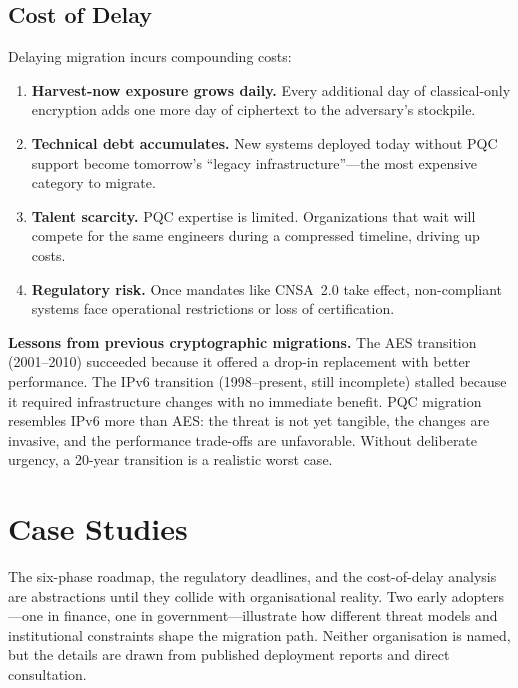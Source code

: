 \subsection{Cost of Delay}
\label{subsec:cost-delay}

Delaying migration incurs compounding costs:
\begin{enumerate}
\item \textbf{Harvest-now exposure grows daily.}  Every additional day of classical-only encryption adds one more day of ciphertext to the adversary's stockpile.
\item \textbf{Technical debt accumulates.}  New systems deployed today without PQC support become tomorrow's ``legacy infrastructure''---the most expensive category to migrate.
\item \textbf{Talent scarcity.}  PQC expertise is limited.  Organizations that wait will compete for the same engineers during a compressed timeline, driving up costs.
\item \textbf{Regulatory risk.}  Once mandates like CNSA~2.0 take effect, non-compliant systems face operational restrictions or loss of certification.
\end{enumerate}

\begin{svgraybox}
\textbf{Lessons from previous cryptographic migrations.}
The AES transition (2001--2010) succeeded because it offered a drop-in replacement with better performance.  The IPv6 transition (1998--present, still incomplete) stalled because it required infrastructure changes with no immediate benefit.  PQC migration resembles IPv6 more than AES: the threat is not yet tangible, the changes are invasive, and the performance trade-offs are unfavorable.  Without deliberate urgency, a 20-year transition is a realistic worst case.
\end{svgraybox}


\section{Case Studies}
\label{sec:case-studies}

The six-phase roadmap, the regulatory deadlines, and the cost-of-delay analysis are abstractions until they collide with organisational reality.  Two early adopters---one in finance, one in government---illustrate how different threat models and institutional constraints shape the migration path.  Neither organisation is named, but the details are drawn from published deployment reports and direct consultation.

